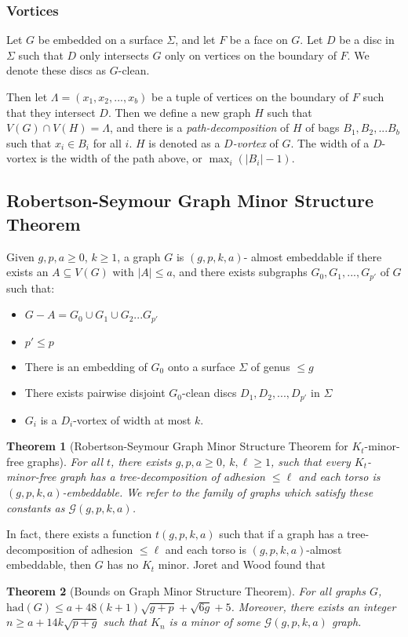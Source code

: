 \documentclass[]{report}
\newcommand{\had}{\text{had}}
\newtheorem{theorem}{Theorem}
\theoremstyle{definition}
\numberwithin{theorem}{section}
\numberwithin{equation}{section}
\begin{document}
\subsubsection{Vortices}\label{sssec:vortices}
Let $G$ be embedded on a surface $\Sigma$, and let $F$ be a face on $G$. Let $D$ be a disc in $\Sigma$ such that $D$ only intersects $G$ only on vertices on the boundary of $F$. We denote these discs as $G$-clean. 

Then let $\Lambda = (x_1, x_2, ..., x_b)$ be a tuple of vertices on the boundary of $F$ such that they intersect $D$. Then we define a new graph $H$ such that $V(G) \cap V(H) = \Lambda$, and there is a \textit{path-decomposition} of $H$ of bags $B_1, B_2, ... B_b$ such that $x_i \in B_i$ for all $i$. $H$ is denoted as a \textit{$D$-vortex} of $G$. The width of a $D$-vortex is the width of the path above, or $\max_i(|B_i| - 1)$. 

\subsection{Robertson-Seymour Graph Minor Structure Theorem\cite{robertsonGraphMinorsXVI2003}}\label{ssec:Robertson_Seymour_Graph_Structure}
Given $g, p, a \geq 0$, $k \geq 1$, a graph $G$ is $(g, p, k, a)$- almost embeddable if there exists an $A \subseteq V(G)$ with $|A| \leq a$, and there exists subgraphs $G_0, G_1, ...,  G_{p'}$ of $G$ such that:
\begin{itemize}
	\item $G - A = G_0 \cup G_1 \cup G_2 ... G_{p'}$
	\item $p' \leq p$
	\item There is an embedding of $G_0$ onto a surface $\Sigma$ of genus $\leq g$
	\item There exists pairwise disjoint $G_0$-clean discs $D_1, D_2, ..., D_{p'}$ in $\Sigma$
	\item $G_i$ is a $D_i$-vortex of width at most $k$.
\end{itemize}

\begin{theorem}[Robertson-Seymour Graph Minor Structure Theorem for $K_t$-minor-free graphs]
	For all $t$, there exists $g, p, a \geq 0$, $k, \ell \geq 1$, such that every $K_t$-minor-free graph has a tree-decomposition of adhesion $\leq \ell$ and each torso is $(g, p, k, a)$-embeddable. We refer to the family of graphs which satisfy these constants as $\mathcal{G}(g, p, k, a)$. 
\end{theorem}
In fact, there exists a function $t(g, p, k, a)$ such that if a graph has a tree-decomposition of adhesion $\leq \ell$ and each torso is $(g, p, k, a)$-almost embeddable, then $G$ has no $K_t$ minor. Joret and Wood\cite{joretCompleteGraphMinors2013} found that
\begin{theorem}[Bounds on Graph Minor Structure Theorem\cite{joretCompleteGraphMinors2013}]\label{thm:graph_structure_bound_theorem}
	For all graphs $G$,
	$\had(G) \leq a + 48(k + 1)\sqrt{g + p} + \sqrt{6g} + 5$. Moreover, there exists an integer $n \geq a + 1 4 k\sqrt{p + g}$ such that $K_n$ is a minor of some $\mathcal{G}(g, p, k, a)$ graph.
\end{theorem}
\end{document}
